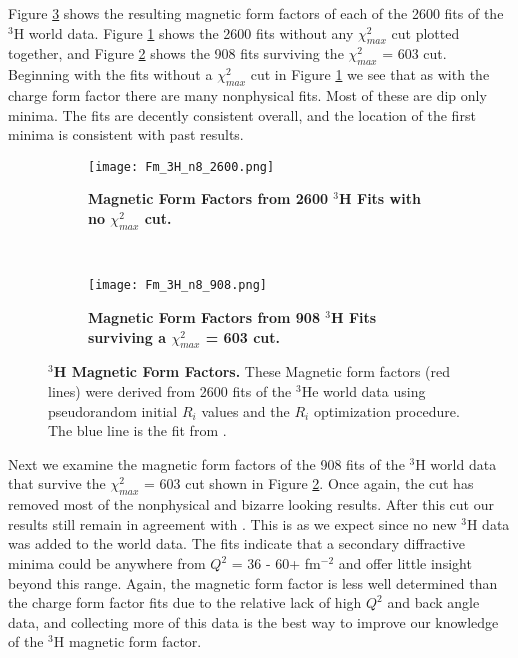 Figure \ref{fig:3h_fm} shows the resulting magnetic form factors of each of the 2600 fits of the $^3$H world data. Figure \ref{fig:3h_fm_no_cut} shows the 2600 fits without any $\chi^2_{max}$ cut plotted together, and Figure \ref{fig:3h_fm_cut} shows the 908 fits surviving the $\chi^2_{max}$ = 603 cut. Beginning with the fits without a $\chi^2_{max}$ cut in Figure \ref{fig:3h_fm_no_cut} we see that as with the charge form factor there are many nonphysical fits. Most of these are dip only minima. The fits are decently consistent overall, and the location of the first minima is consistent with past results. 

\begin{figure}[!ht]
\begin{subfigure}{1.\textwidth}
  \centering
  \texttt{[image: Fm\_3H\_n8\_2600.png]}
  \caption{\bf{Magnetic Form Factors from 2600 $^3$H Fits with no $\chi^2_{max}$ cut.}}
  \label{fig:3h_fm_no_cut}
\end{subfigure}\\
\begin{subfigure}{1.\textwidth}
  \centering
  \texttt{[image: Fm\_3H\_n8\_908.png]}
  \caption{\bf{Magnetic Form Factors from 908 $^3$H Fits surviving a $\chi^2_{max}$ = 603 cut.}}
  \label{fig:3h_fm_cut}
\end{subfigure}
\caption[$^3$H Magnetic Form Factors] {
{\bf{$^3$H Magnetic Form Factors.}} These Magnetic form factors (red lines) were derived from 2600 fits of the $^3$He world data using pseudorandom initial $R_i$ values and the $R_i$ optimization procedure. The blue line is the fit from \cite{Article:Amroun}.}
\label{fig:3h_fm}
\end{figure}

Next we examine the magnetic form factors of the 908 fits of the $^3$H world data that survive the $\chi^2_{max}$ = 603 cut shown in Figure \ref{fig:3h_fm_cut}. Once again, the cut has removed most of the nonphysical and bizarre looking results. After this cut our results still remain in agreement with \cite{Article:Amroun}. This is as we expect since no new $^3$H data was added to the world data. The fits indicate that a secondary diffractive minima could be anywhere from $Q^2$ = 36 - 60+ fm$^{-2}$ and offer little insight beyond this range. Again, the magnetic form factor is less well determined than the charge form factor fits due to the relative lack of high $Q^2$ and back angle data, and collecting more of this data is the best way to improve our knowledge of the $^3$H magnetic form factor. 

